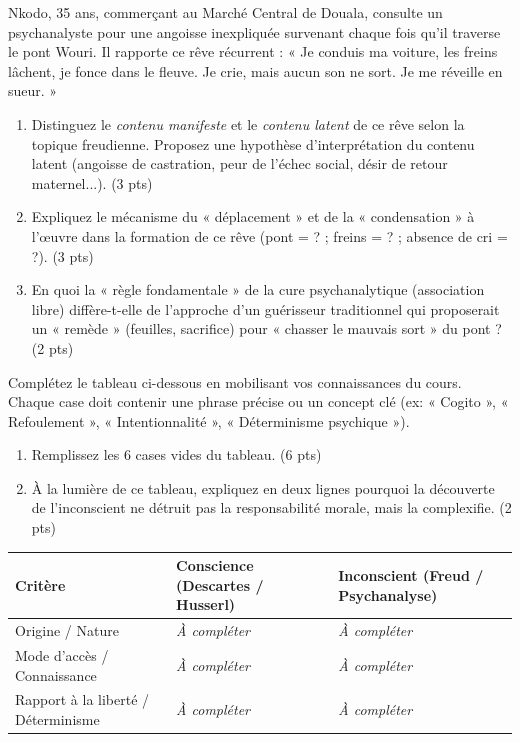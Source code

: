 \documentclass[11pt]{article}
\begin{document}
\begin{exercice}
Nkodo, 35 ans, commerçant au Marché Central de Douala, consulte un psychanalyste pour une angoisse inexpliquée survenant chaque fois qu'il traverse le pont Wouri. Il rapporte ce rêve récurrent : « Je conduis ma voiture, les freins lâchent, je fonce dans le fleuve. Je crie, mais aucun son ne sort. Je me réveille en sueur. »
\begin{enumerate}
    \item Distinguez le \textit{contenu manifeste} et le \textit{contenu latent} de ce rêve selon la topique freudienne. Proposez une hypothèse d'interprétation du contenu latent (angoisse de castration, peur de l'échec social, désir de retour maternel...). (3 pts)
    \item Expliquez le mécanisme du « déplacement » et de la « condensation » à l'œuvre dans la formation de ce rêve (pont = ? ; freins = ? ; absence de cri = ?). (3 pts)
    \item En quoi la « règle fondamentale » de la cure psychanalytique (association libre) diffère-t-elle de l'approche d'un guérisseur traditionnel qui proposerait un « remède » (feuilles, sacrifice) pour « chasser le mauvais sort » du pont ? (2 pts)
\end{enumerate}
\end{exercice}

\begin{exercice}
Complétez le tableau ci-dessous en mobilisant vos connaissances du cours. Chaque case doit contenir une phrase précise ou un concept clé (ex: « Cogito », « Refoulement », « Intentionnalité », « Déterminisme psychique »).
\begin{enumerate}
    \item Remplissez les 6 cases vides du tableau. (6 pts)
    \item À la lumière de ce tableau, expliquez en deux lignes pourquoi la découverte de l'inconscient ne détruit pas la responsabilité morale, mais la complexifie. (2 pts)
\end{enumerate}

\noindent \begin{tabularx}{\linewidth}{|X|X|X|}
\hline
\textbf{Critère} & \textbf{Conscience (Descartes / Husserl)} & \textbf{Inconscient (Freud / Psychanalyse)} \\
\hline
Origine / Nature & \textit{À compléter} & \textit{À compléter} \\
\hline
Mode d'accès / Connaissance & \textit{À compléter} & \textit{À compléter} \\
\hline
Rapport à la liberté / Déterminisme & \textit{À compléter} & \textit{À compléter} \\
\hline
\end{tabularx}
\end{exercice}
\end{document}
